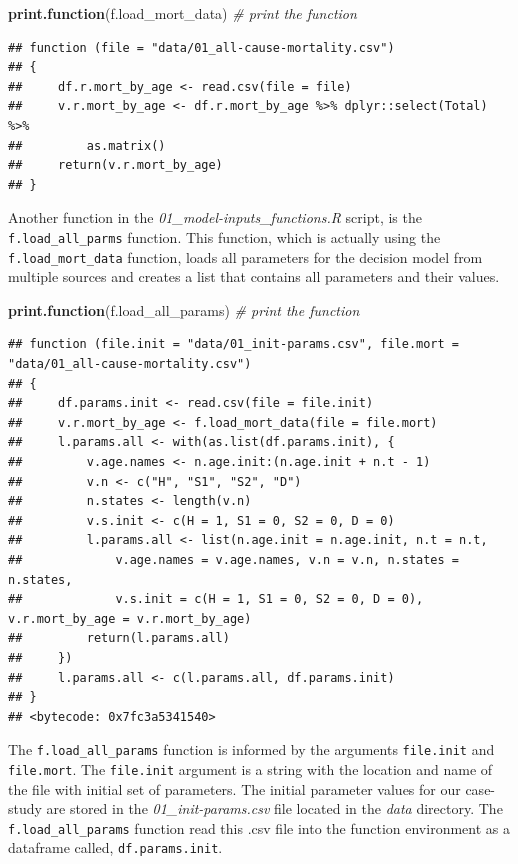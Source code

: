 \documentclass[]{article}
\newenvironment{Shaded}{\begin{snugshade}}{\end{snugshade}}
\newcommand{\KeywordTok}[1]{\textcolor[rgb]{0.13,0.29,0.53}{\textbf{#1}}}
\newcommand{\CommentTok}[1]{\textcolor[rgb]{0.56,0.35,0.01}{\textit{#1}}}
\newcommand{\NormalTok}[1]{#1}
\begin{document}
\begin{Shaded}
\begin{Highlighting}[]
\KeywordTok{print.function}\NormalTok{(f.load_mort_data) }\CommentTok{# print the function}
\end{Highlighting}
\end{Shaded}

\begin{verbatim}
## function (file = "data/01_all-cause-mortality.csv") 
## {
##     df.r.mort_by_age <- read.csv(file = file)
##     v.r.mort_by_age <- df.r.mort_by_age %>% dplyr::select(Total) %>% 
##         as.matrix()
##     return(v.r.mort_by_age)
## }
\end{verbatim}

Another function in the \emph{01\_model-inputs\_functions.R} script, is
the \texttt{f.load\_all\_parms} function. This function, which is
actually using the \texttt{f.load\_mort\_data} function, loads all
parameters for the decision model from multiple sources and creates a
list that contains all parameters and their values.

\begin{Shaded}
\begin{Highlighting}[]
\KeywordTok{print.function}\NormalTok{(f.load_all_params)  }\CommentTok{# print the function}
\end{Highlighting}
\end{Shaded}

\begin{verbatim}
## function (file.init = "data/01_init-params.csv", file.mort = "data/01_all-cause-mortality.csv") 
## {
##     df.params.init <- read.csv(file = file.init)
##     v.r.mort_by_age <- f.load_mort_data(file = file.mort)
##     l.params.all <- with(as.list(df.params.init), {
##         v.age.names <- n.age.init:(n.age.init + n.t - 1)
##         v.n <- c("H", "S1", "S2", "D")
##         n.states <- length(v.n)
##         v.s.init <- c(H = 1, S1 = 0, S2 = 0, D = 0)
##         l.params.all <- list(n.age.init = n.age.init, n.t = n.t, 
##             v.age.names = v.age.names, v.n = v.n, n.states = n.states, 
##             v.s.init = c(H = 1, S1 = 0, S2 = 0, D = 0), v.r.mort_by_age = v.r.mort_by_age)
##         return(l.params.all)
##     })
##     l.params.all <- c(l.params.all, df.params.init)
## }
## <bytecode: 0x7fc3a5341540>
\end{verbatim}

The \texttt{f.load\_all\_params} function is informed by the arguments
\texttt{file.init} and \texttt{file.mort}. The \texttt{file.init}
argument is a string with the location and name of the file with initial
set of parameters. The initial parameter values for our case-study are
stored in the \emph{01\_init-params.csv} file located in the \emph{data}
directory. The \texttt{f.load\_all\_params} function read this .csv file
into the function environment as a dataframe called,
\texttt{df.params.init}.
\end{document}
